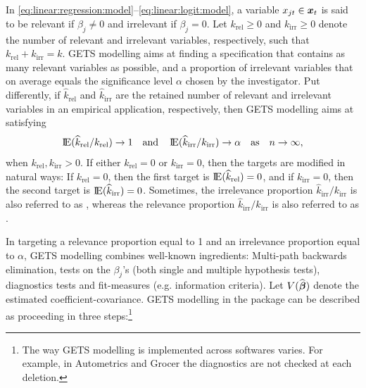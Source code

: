 In \eqref{eq:linear:regression:model}--\eqref{eq:linear:logit:model}, a variable $x_{jt} \in \boldsymbol{x}_t$ is said to be relevant if $\beta_j \neq 0$ and irrelevant if $\beta_j = 0$. Let $k_{\text{rel}} \geq 0$ and $k_{\text{irr}} \geq 0$ denote the number of relevant and irrelevant variables, respectively, such that $k_{\text{rel}} + k_{\text{irr}} = k$. GETS modelling aims at finding a specification that contains as many relevant variables as possible, and a proportion of irrelevant variables that on average equals the significance level $\alpha$ chosen by the investigator. Put differently, if $\widehat{k}_{\text{rel}}$ and $\widehat{k}_{\text{irr}}$ are the retained number of relevant and irrelevant variables in an empirical application, respectively, then GETS modelling aims at satisfying 
%
\begin{equation}\label{eq:asymptotic:gauge:and:potency}
	\E(\widehat{k}_{\text{rel}}/k_{\text{rel}}) \rightarrow 1 \quad \textnormal{and} \quad \E(\widehat{k}_{\text{irr}}/k_{\text{irr}}) \rightarrow \alpha \quad \textnormal{as} \quad n\rightarrow\infty,
\end{equation}
%
when $k_{\text{rel}},k_{\text{irr}}>0$.  If either $k_{\text{rel}}=0$ or $k_{\text{irr}}=0$, then the targets are modified in natural ways: If $k_{\text{rel}}=0$, then the first target is $\E(\widehat{k}_{\text{rel}}) = 0$, and if $k_{\text{irr}}=0$, then the second target is $\E(\widehat{k}_{\text{irr}}) = 0$. Sometimes, the irrelevance proportion $\widehat{k}_{\text{irr}}/k_{\text{irr}}$ is also referred to as , whereas the relevance proportion $\widehat{k}_{\text{irr}}/k_{\text{irr}}$ is also referred to as .

In targeting a relevance proportion equal to 1 and an irrelevance proportion equal to $\alpha$, GETS modelling combines well-known ingredients: Multi-path backwards elimination, tests on the $\beta_j$'s (both single and multiple hypothesis tests), diagnostics tests and fit-measures (e.g. information criteria). Let $V(\widehat{\boldsymbol{\beta}})$ denote the estimated coefficient-covariance. GETS modelling in the package  can be described as proceeding in three steps:\footnote{The way GETS modelling is implemented across softwares varies. For example, in Autometrics and Grocer the diagnostics are not checked at each deletion.} 

